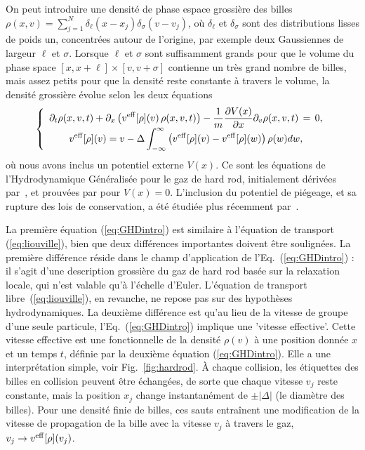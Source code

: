 On peut introduire une densité de phase espace grossière des billes \(\rho(x,v) = \sum_{j=1}^N \delta_\ell (x-x_j) \delta_\sigma (v-v_j)\), où \(\delta_\ell\) et \(\delta_\sigma\) sont des distributions lisses de poids un, concentrées autour de l'origine, par exemple deux Gaussiennes de largeur \(\ell\) et \(\sigma\). Lorsque \(\ell\) et \(\sigma\) sont suffisamment grands pour que le volume du phase space \([x,x+ \ell] \times [v,v+\sigma]\) contienne un très grand nombre de billes, mais assez petits pour que la densité reste constante à travers le volume, la densité grossière évolue selon les deux équations
\begin{equation}
    \label{eq:GHDintro}
    \left\{ \begin{array}{c}
       \displaystyle \partial_t \rho(x,v,t) + \partial_x \left( v^{\rm eff}[\rho](v) \, \rho(x,v,t) \right) - \frac{1}{m}\frac{\partial V(x)}{\partial x} \partial_v \rho(x,v,t) \, = \, 0, \\
       \displaystyle  v^{\rm eff}[\rho](v) = v - \Delta  \int_{-\infty}^\infty   \left( v^{\rm eff}[\rho](v) - v^{\rm eff}[\rho](w) \right)  \rho(w) dw ,
    \end{array} \right.
\end{equation}
où nous avons inclus un potentiel externe \(V(x)\). Ce sont les équations de l'Hydrodynamique Généralisée pour le gaz de hard rod, initialement dérivées par~\cite{percus1976equilibrium}, et prouvées par \cite{boldrighini1983one} pour \(V(x)=0\). L'inclusion du potentiel de piégeage, et sa rupture des lois de conservation, a été étudiée plus récemment par~\cite{cao2018incomplete}.

La première équation (\ref{eq:GHDintro}) est similaire à l'équation de transport (\ref{eq:liouville}), bien que deux différences importantes doivent être soulignées. La première différence réside dans le champ d'application de l'Eq.~(\ref{eq:GHDintro}) : il s'agit d'une description grossière du gaz de hard rod basée sur la relaxation locale, qui n'est valable qu'à l'échelle d'Euler. L'équation de transport libre~(\ref{eq:liouville}), en revanche, ne repose pas sur des hypothèses hydrodynamiques. La deuxième différence est qu'au lieu de la vitesse de groupe d'une seule particule, l'Eq.~(\ref{eq:GHDintro}) implique une 'vitesse effective'. Cette vitesse effective est une fonctionnelle de la densité \(\rho(v)\) à une position donnée \(x\) et un temps \(t\), définie par la deuxième équation (\ref{eq:GHDintro}). Elle a une interprétation simple, voir Fig.~\ref{fig:hardrod}. À chaque collision, les étiquettes des billes en collision peuvent être échangées, de sorte que chaque vitesse \(v_j\) reste constante, mais la position \(x_j\) change instantanément de \(\pm |\Delta|\) (le diamètre des billes). Pour une densité finie de billes, ces sauts entraînent une modification de la vitesse de propagation de la bille avec la vitesse \(v_j\) à travers le gaz, \(v_j \rightarrow v^{\rm eff}[\rho](v_j)\).

